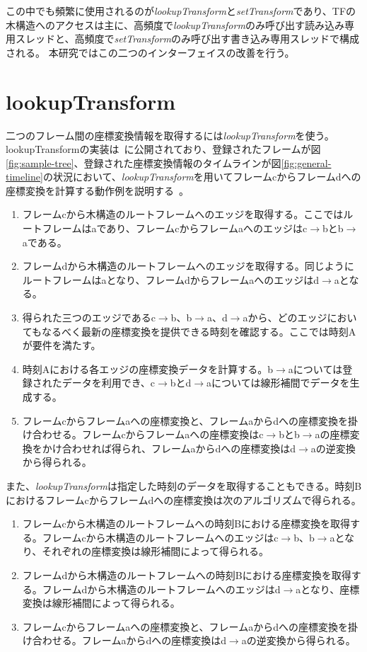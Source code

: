 \documentclass[a4paper]{jreport}	%
\begin{document}
この中でも頻繁に使用されるのが\textit{lookupTransform}と\textit{setTransform}であり、TFの木構造へのアクセスは主に、高頻度で\textit{lookupTransform}のみ呼び出す読み込み専用スレッドと、高頻度で\textit{setTransform}のみ呼び出す書き込み専用スレッドで構成される。
本研究ではこの二つのインターフェイスの改善を行う。


\section{lookupTransform}
\label{section:lookupTrnasform}

二つのフレーム間の座標変換情報を取得するには\textit{lookupTransform}を使う。lookupTransformの実装は~\cite{lookupTransform}に公開されており、登録されたフレームが図\ref{fig:sample-tree}、登録された座標変換情報のタイムラインが図\ref{fig:general-timeline}の状況において、\textit{lookupTransform}を用いてフレームcからフレームdへの座標変換を計算する動作例を説明する~\cite{lookupTransform}。

\begin{enumerate}
	\item フレームcから木構造のルートフレームへのエッジを取得する。ここではルートフレームはaであり、フレームcからフレームaへのエッジはc$\rightarrow$bとb$\rightarrow$aである。
	\item フレームdから木構造のルートフレームへのエッジを取得する。同じようにルートフレームはaとなり、フレームdからフレームaへのエッジはd$\rightarrow$aとなる。
	\item 得られた三つのエッジであるc$\rightarrow$b、b$\rightarrow$a、d$\rightarrow$aから、どのエッジにおいてもなるべく最新の座標変換を提供できる時刻を確認する。ここでは時刻Aが要件を満たす。
	\item 時刻Aにおける各エッジの座標変換データを計算する。b$\rightarrow$aについては登録されたデータを利用でき、c$\rightarrow$bとd$\rightarrow$aについては線形補間でデータを生成する。
	\item フレームcからフレームaへの座標変換と、フレームaからdへの座標変換を掛け合わせる。フレームcからフレームaへの座標変換はc$\rightarrow$bとb$\rightarrow$aの座標変換をかけ合わせれば得られ、フレームaからdへの座標変換はd$\rightarrow$aの逆変換から得られる。
\end{enumerate}
また、\textit{lookupTransform}は指定した時刻のデータを取得することもできる。時刻Bにおけるフレームcからフレームdへの座標変換は次のアルゴリズムで得られる。

\begin{enumerate}
	\item フレームcから木構造のルートフレームへの時刻Bにおける座標変換を取得する。フレームcから木構造のルートフレームへのエッジはc$\rightarrow$b、b$\rightarrow$aとなり、それぞれの座標変換は線形補間によって得られる。
	\item フレームdから木構造のルートフレームへの時刻Bにおける座標変換を取得する。フレームdから木構造のルートフレームへのエッジはd$\rightarrow$aとなり、座標変換は線形補間によって得られる。
	\item フレームcからフレームaへの座標変換と、フレームaからdへの座標変換を掛け合わせる。フレームaからdへの座標変換はd$\rightarrow$aの逆変換から得られる。
\end{enumerate}
\end{document}
